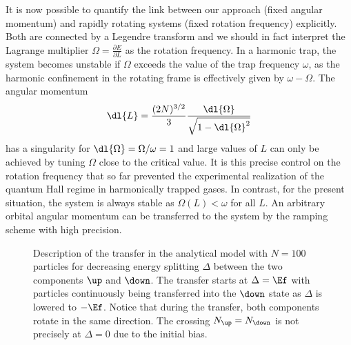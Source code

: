 It is now possible to quantify the link between our approach (fixed angular momentum) and rapidly rotating systems (fixed rotation frequency) explicitly. Both are connected by a Legendre transform and we should in fact interpret the Lagrange multiplier $\Omega=\frac{\partial E}{\partial L}$
as the rotation frequency. In a harmonic trap, the system becomes unstable if $\Omega$ exceeds the value of the trap frequency $\omega$, as the harmonic confinement in the rotating frame is effectively given by $\omega-\Omega$. The angular momentum
\begin{align*}
\dl{L}=\frac{(2N)^{3/2}}{3} \frac{\dl{\Omega}}{\sqrt{1-\dl{\Omega}^2}}
\end{align*}
has a singularity for $\dl{\Omega}=\Omega/\omega=1$ and large values of $L$ can only be achieved by tuning $\Omega$ close to the critical value. It is this precise control on the rotation frequency that so far prevented the experimental realization of the quantum Hall regime in harmonically trapped gases. In contrast, for the present situation, the system is always stable as $\Omega(L)<\omega$ for all $L$. An arbitrary orbital angular momentum can be transferred to the system by the ramping scheme with high precision.



\begin{figure}[t]
    \centering
    \caption{Description of the transfer in the analytical model with $N=100$ particles for decreasing energy splitting $\Delta$ between the two components $\up$ and $\down$. The transfer starts at $\Delta=\Ef$ with particles continuously being transferred into the $\down$ state as $\Delta$ is lowered to $-\Ef$. Notice that during the transfer, both components rotate in the same direction. The crossing $N_\up=N_\down$ is not precisely at $\Delta=0$ due to the initial bias.}
\end{figure}

